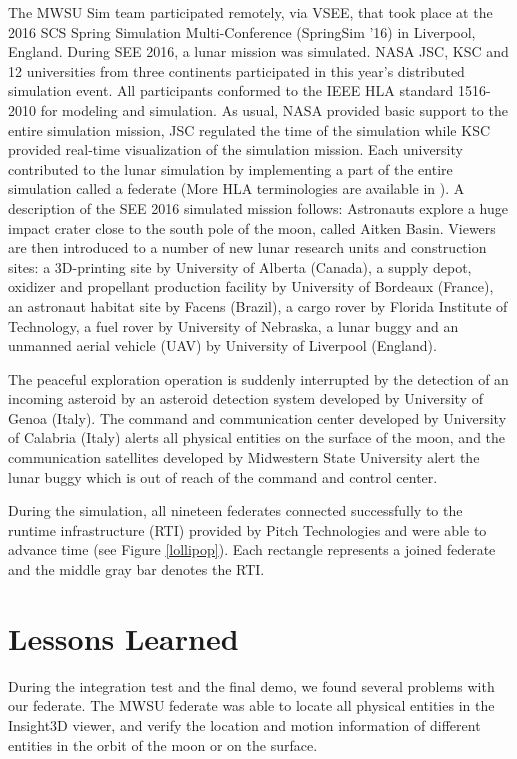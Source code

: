\documentclass[conference]{IEEEtran}
\begin{document}
The MWSU Sim team participated remotely, via VSEE, that took place at the 2016 SCS Spring Simulation Multi-Conference (SpringSim '16) in Liverpool, England.  During SEE 2016, a lunar mission was simulated. NASA JSC, KSC and 12 universities from three continents participated in this year\rq{}s distributed simulation event. All participants conformed to the IEEE HLA standard 1516-2010 for modeling and simulation. As usual, NASA provided basic support to the entire simulation mission, JSC regulated the time of the simulation while KSC provided real-time visualization of the simulation mission. Each university contributed to the lunar simulation by implementing a part of the entire simulation called a federate (More HLA terminologies are available in \cite{HLA}). A description of the SEE 2016 simulated mission follows: Astronauts explore a huge impact crater close to the south pole of the moon, called Aitken Basin.  Viewers are then introduced to a number of new lunar research units and construction sites: a 3D-printing site by University of Alberta (Canada), a supply depot, oxidizer and propellant production facility by University of Bordeaux (France), an astronaut habitat site by Facens (Brazil), a cargo rover by Florida Institute of Technology, a fuel rover by University of Nebraska, a lunar buggy and an unmanned aerial vehicle (UAV) by University of Liverpool (England).

The peaceful exploration operation is suddenly interrupted by the detection of an incoming asteroid by an asteroid detection system developed by University of Genoa (Italy). The command and communication center \cite{falcone2014simulation} developed by University of Calabria (Italy) alerts all physical entities on the surface of the moon, and the communication satellites developed by Midwestern State University alert the lunar buggy which is out of reach of the command and control center.

During the simulation, all nineteen federates connected successfully to the runtime infrastructure (RTI) provided by Pitch Technologies and were able to advance time (see Figure \ref{lollipop}). Each rectangle represents a joined federate and the middle gray bar denotes the RTI.

\section{Lessons Learned}
During the integration test and the final demo, we found several problems with our federate.  The MWSU federate was able to locate all physical entities in the Insight3D viewer, and verify the location and motion information of different entities in the orbit of the moon or on the surface.  
\end{document}
